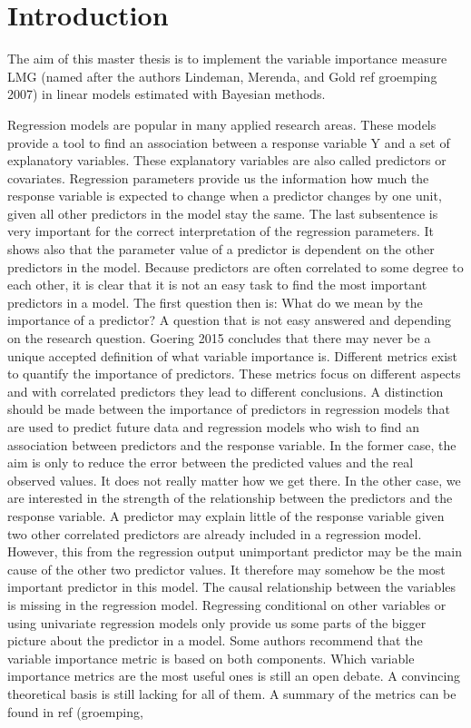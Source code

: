 \documentclass[11pt,a4paper,twoside]{book}
\begin{document}







\chapter{Introduction}

The aim of this master thesis is to implement the variable importance measure LMG (named after the authors Lindeman, Merenda, and Gold ref groemping 2007) in linear models estimated with Bayesian methods. 

Regression models are popular in many applied research areas. These models provide a tool to find an association between a response variable Y and a set of explanatory variables. These explanatory variables are also called predictors or covariates. Regression parameters provide us the information how much the response variable is expected to change when a predictor changes by one unit, given all other predictors in the model stay the same. The last subsentence is very important for the correct interpretation of the regression parameters. It shows also that the parameter value of a predictor is dependent on the other predictors in the model. Because predictors are often correlated to some degree to each other, it is clear that it is not an easy task to find the most important predictors in a model. The first question then is: What do we  mean by the importance of a predictor? A question that is not easy answered and depending on the research question. Goering 2015 concludes that there may never  be a unique accepted definition of what variable importance is.   Different metrics exist to quantify the importance of predictors. These metrics focus on different aspects and with correlated predictors they  lead to different conclusions. A distinction should be made between the importance of predictors in regression models that are used to predict future data and regression models who wish to find an association between predictors and the response variable. In the former case, the aim is only to reduce the error between the predicted values and the real observed values. It does not really matter how we get there. In the other case, we are interested in the strength of the relationship between the predictors and the response variable. A predictor may explain little of the response variable given two other correlated predictors are already included in a regression model. However, this from the regression output unimportant predictor may be the main cause of the other two predictor values.  It therefore may somehow be the most important predictor in this model. The causal relationship between the variables is missing in the regression model. Regressing conditional on  other variables or using univariate regression models only provide us some parts of the bigger picture about the predictor in a model. Some authors recommend that the variable importance metric is based on both components. Which variable importance metrics are the most useful ones is still an open debate. A convincing theoretical basis is still lacking for all of them. A summary of the metrics can be found in ref (groemping, 
\end{document}
